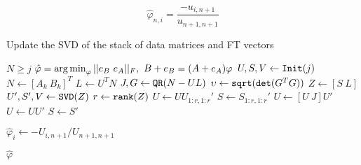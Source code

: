\documentclass[/home/francois/latex/report/main.tex]{subfiles}
\begin{document}
\begin{equation}
  \label{eq:background:phi-final}
  \hat{\varphi}_{n, i} = \frac{-u_{i, n+1}}{u_{n+1, n+1}}
\end{equation}

\begin{algorithm}
\caption{Update the \ac{SVD} of the stack of data matrices and \ac{FT} vectors \label{alg:background:adaptation}}
\begin{algorithmic}
\REQUIRE $N \geq j$
\ENSURE $\hat{\varphi} = \argmin_{\varphi} ||e_B \ e_A||_F, \ B + e_B = (A + e_A) \varphi$
\STATE $U, S, V \leftarrow \text{\texttt{Init}}(j)$
\STATE $N \leftarrow [A_k \ B_k]^T$
\STATE $L \leftarrow U^T N$
\STATE $J, G \leftarrow \text{\texttt{QR}}(N - UL)$
\STATE $\upsilon \leftarrow \text{\texttt{sqrt}}(\text{\texttt{det}}(G^TG))$
\IF{$\upsilon \leq \varepsilon$}
\STATE $Z \leftarrow [S \ L]$
\STATE $U', S', V \leftarrow \text{\texttt{SVD}}(Z)$
\STATE $r \leftarrow \text{\texttt{rank}}(Z)$
\STATE $U \leftarrow U U_{1:r, 1:r}'$
\STATE $S \leftarrow S_{1:r, 1:r}'$
\ELSE
\STATE $U \leftarrow [U \ J] U'$
\STATE $U \leftarrow U U'$
\STATE $S \leftarrow S'$
\ENDIF
\ENDFOR

\STATE $\hat{\varphi}_i \leftarrow -U_{i, n+1} / U_{n+1, n+1}$
\ENDFOR

\RETURN $\hat{\varphi}$
\end{algorithmic}
\end{algorithm}
\end{document}
